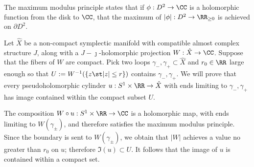 


    The maximum modulus principle states that if $\phi: D^2\to \CC$ is a holomorphic function from the disk to $\CC$, that the maximum of $|\phi|: D^2\to \RR_{\geq 0}$ is achieved on $\partial D^2$.

    Let $\hat X$ be a non-compact symplectic manifold with compatible almost complex structure $J$, along with a $J-\jmath$-holomorphic projection $W: \hat X\to \CC$. Suppose that the fibers of $W$ are compact. Pick two loops $\gamma_-, \gamma_+\subset \hat X$ and $r_0\in \RR$ large enough so that $U:=W^{-1}(\{z \st |z|\leq r\})$ contains $\gamma_-, \gamma_+$. We will prove that every pseudoholomorphic cylinder $u: S^1\times \RR\to \hat X$ with ends limiting to $\gamma_-, \gamma_+$ has image contained within the compact subset $U$. 

    The composition $W\circ u: S^1\times \RR\to \CC$ is a holomorphic map, with ends limiting to $W(\gamma_\pm)$, and therefore satisfies the maximum modulus principle. Since the boundary is sent to $W(\gamma_\pm)$, we obtain that $|W|$ achieves a value no greater than $r_0$ on $u$; therefore $\Im(u)\subset U$. It follows that the image of $u$ is contained within a compact set. 
    \label{exm:compactnessFromMaximumModulus}
